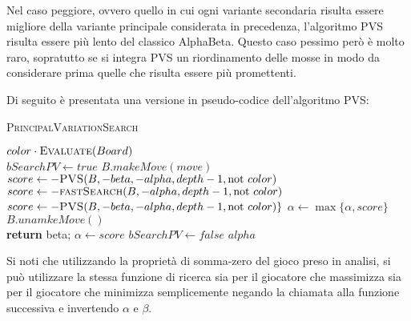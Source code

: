 \documentclass[a4paper]{article}
\begin{document}
Nel caso peggiore, ovvero quello in cui ogni variante secondaria risulta essere
migliore della variante principale considerata in precedenza, l'algoritmo PVS 
risulta essere più lento del classico AlphaBeta. Questo caso pessimo però è 
molto raro, sopratutto se si integra PVS un riordinamento delle mosse in modo
da considerare prima quelle che risulta essere più promettenti.

Di seguito è presentata una versione in pseudo-codice dell'algoritmo PVS:

\begin{algorithm}[H]
  \caption{\textsc{PrincipalVariationSearch}}
  \label{alg_pvs}
  \begin{algorithmic}[0]

        \State \Return $color \cdot \Call{Evaluate}{Board}$
      \EndIf
      \\
      \State $bSearchPV \gets true$
        \State $B.makeMove(move)$
          \State $score \gets -\Call{PVS}{B, -beta, -alpha, depth - 1, \textrm{not } color}$
        \Else
          \State $score \gets -\Call{fastSearch}{B, -alpha, depth - 1, \textrm{not } color}$
            \State $score \gets -\Call{PVS}{B, -beta, -alpha, depth - 1, \textrm{not } color}\}$
            \State $\alpha \gets \max\{\alpha, score\}$
          \EndIf
        \EndIf
        \State $B.unamkeMove()$
        \\
        \State \textbf{return} beta;
        \EndIf
          \State $\alpha \gets score$
        \EndIf
        \State $bSearchPV \gets false$
      \EndFor
      \State \Return $alpha$
    \EndFunction

  \end{algorithmic}
\end{algorithm}

Si noti che utilizzando la proprietà di somma-zero del gioco preso in analisi, 
si può utilizzare la stessa funzione di ricerca sia per il giocatore che 
massimizza sia per il giocatore che minimizza semplicemente negando la chiamata
alla funzione successiva e invertendo $\alpha$ e $\beta$.
\end{document}

